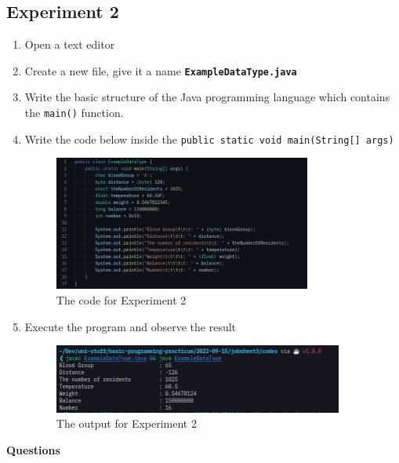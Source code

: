 \documentclass[12pt,titlepage]{article}
\begin{document}
\subsection{Experiment 2}
\begin{enumerate}
    \item Open a text editor
    \item Create a new file, give it a name \texttt{\textbf{ExampleDataType.java}}
    \item Write the basic structure of the Java programming language which contains the \texttt{main()} function.
    \item {
        Write the code below inside the \texttt{public static void main(String[] args)}
        
        \begin{figure}[h]
            \centering
            \includegraphics[width=0.8\textwidth]{./images/datatype-code.png}
            \caption{The code for Experiment 2}
        \end{figure}
    }
    \pagebreak
    \item {
        Execute the program and observe the result

        \begin{figure}[h]
            \centering
            \includegraphics[width=0.9\textwidth]{./images/datatype-output.png}
            \caption{The output for Experiment 2}
        \end{figure}
    }
\end{enumerate}
\textbf{Questions}
\end{document}

